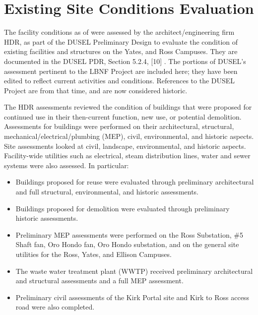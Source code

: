 \section{Existing  Site Conditions Evaluation}
\label{sec:fscf-site-cond-eval}

The facility conditions as of  were assessed by the architect/engineering firm HDR, as part of the DUSEL Preliminary Design to
evaluate the condition of existing facilities and structures on the Yates, and Ross Campuses.
They are documented in the DUSEL PDR, Section 5.2.4, [10] . 
The portions of DUSEL's assessment pertinent to the LBNF Project are included here; they have been edited to reflect current activities and conditions. References to the DUSEL Project are from that time, and are now considered historic.


The HDR assessments reviewed the condition of buildings that were proposed for %
continued use in their then-current function, new use, or potential demolition. Assessments for buildings were performed %
on their architectural, structural, mechanical/electrical/plumbing (MEP), civil, environmental, and historic aspects. Site assessments looked at %
civil, landscape, environmental, and historic aspects. Facility-wide utilities such as electrical, steam distribution lines, water and sewer systems were also assessed. In particular:

\begin{itemize} 
\item Buildings proposed for reuse were evaluated through preliminary architectural and full structural, environmental, and historic assessments. 
\item Buildings proposed for demolition were evaluated through preliminary historic assessments.
\item Preliminary MEP assessments were performed on the Ross Substation, \#5 Shaft fan, Oro Hondo fan, Oro Hondo substation, and on the general site utilities for the Ross, Yates, and Ellison Campuses.
 \item The waste water treatment plant (WWTP) received preliminary architectural and structural assessments and a full MEP assessment.
 \item Preliminary civil assessments of the Kirk Portal site and Kirk to Ross access road were also completed.
 \end{itemize}

